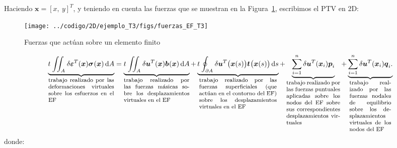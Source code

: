 \documentclass[12pt,letterpaper, landscape]{article}
\newcommand{\e}{{}}
\newcommand{\ve}[1]{{\boldsymbol{#1}}}
\newcommand{\dd}{\operatorname{d} \!}
\begin{document}
Haciendo $\ve{x} = [x,\ y]^T$, y teniendo en cuenta las fuerzas que se muestran en la Figura~\ref{eq:fuerzas_sobre_EF}, escribimos el PTV en 2D:
\begin{figure}[p]
   \centering   
   \texttt{[image: ../codigo/2D/ejemplo\_T3/figs/fuerzas\_EF\_T3]}
   \caption{Fuerzas que actúan sobre un elemento finito}
   \label{eq:fuerzas_sobre_EF}
\end{figure}
\begin{equation}
\underbrace{t^\e \iint_{A^\e} \delta\ve{\varepsilon}_\e^T(\ve{x}) \ve{\sigma}^\e(\ve{x}) \dd A}_{\footnotesize\parbox{11em}{trabajo realizado por las deformaciones virtuales sobre los esfuerzos en el EF}}
 = \underbrace{t^\e \iint_{A^\e} \delta \ve{u}_\e^T(\ve{x}) \ve{b}^\e(\ve{x}) \dd A}_{\footnotesize\parbox{11em}{trabajo realizado por las fuerzas másicas sobre los desplazamientos virtuales en el EF}}
+ \underbrace{t^\e \oint_{\partial A^\e} \delta \ve{u}_\e^T\big(\ve{x}(s)\big) \ve{t}^\e\big(\ve{x}(s)\big) \dd s}_{\footnotesize\parbox{13em}{trabajo realizado por las fuerzas superficiales (que actúan en el contorno del EF) sobre los desplazamientos virtuales en el EF}}
+ \underbrace{\sum_{i=1}^n \delta \ve{u}_\e^T(\ve{x}_i) \ve{p}_i^\e}_{\footnotesize\parbox{9em}{trabajo realizado por las fuerzas puntuales aplicadas sobre los nodos del EF sobre sus correspondientes desplazamientos virtuales}}
+ \underbrace{\sum_{i=1}^n \delta \ve{u}_\e^T(\ve{x}_i) \ve{q}_i^\e.}_{\footnotesize\parbox{7em}{trabajo realizado por las fuerzas nodales de equilibrio sobre los desplazamientos virtuales de los nodos del EF}} \label{eq:PTV}
\end{equation}
donde: 
\end{document}
